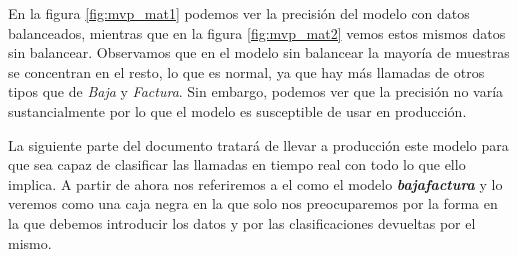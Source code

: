 En la figura \ref{fig:mvp_mat1} podemos ver la precisión del modelo con datos balanceados, mientras que en la figura  \ref{fig:mvp_mat2} vemos estos mismos datos sin balancear. Observamos que en el modelo sin balancear la mayoría de muestras se concentran en el resto, lo que es normal, ya que hay más llamadas de otros tipos que de \textit{Baja} y \textit{Factura}. Sin embargo, podemos ver que la precisión no varía sustancialmente por lo que el modelo es susceptible de usar en producción.


La siguiente parte del documento tratará de llevar a producción este modelo para que sea capaz de clasificar las llamadas en tiempo real con todo lo que ello implica. A partir de ahora nos referiremos a el como el modelo \textit{\textbf{bajafactura}} y lo veremos como una caja negra en la que solo nos preocuparemos por la forma en la que debemos introducir los datos y por las clasificaciones devueltas por el mismo.

